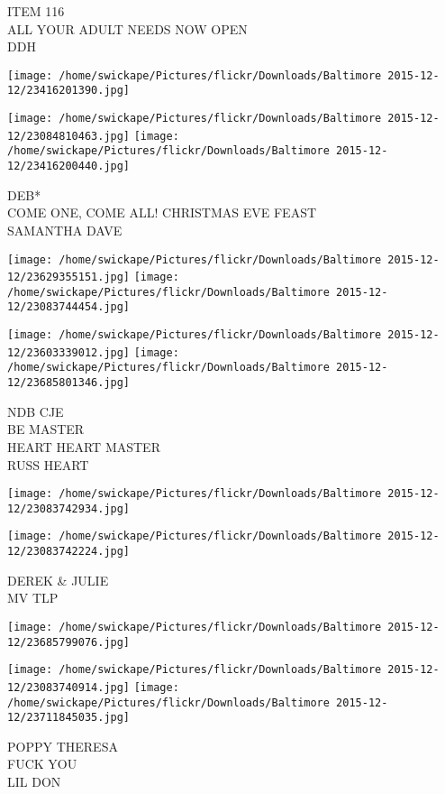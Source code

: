 \documentclass[10pt,letterpaper]{article}
\begin{document}
ITEM 116\\
ALL YOUR ADULT NEEDS NOW OPEN\\
DDH
\pagebreak

\texttt{[image: /home/swickape/Pictures/flickr/Downloads/Baltimore 2015-12-12/23416201390.jpg]}

\vspace{0.25in}
\texttt{[image: /home/swickape/Pictures/flickr/Downloads/Baltimore 2015-12-12/23084810463.jpg]}
\texttt{[image: /home/swickape/Pictures/flickr/Downloads/Baltimore 2015-12-12/23416200440.jpg]}

DEB*\\
COME ONE, COME ALL!  CHRISTMAS EVE FEAST\\
SAMANTHA DAVE
\pagebreak

\texttt{[image: /home/swickape/Pictures/flickr/Downloads/Baltimore 2015-12-12/23629355151.jpg]}
\texttt{[image: /home/swickape/Pictures/flickr/Downloads/Baltimore 2015-12-12/23083744454.jpg]}

\texttt{[image: /home/swickape/Pictures/flickr/Downloads/Baltimore 2015-12-12/23603339012.jpg]}
\texttt{[image: /home/swickape/Pictures/flickr/Downloads/Baltimore 2015-12-12/23685801346.jpg]}

NDB CJE\\
BE MASTER\\
HEART HEART MASTER\\
RUSS HEART
\pagebreak

\texttt{[image: /home/swickape/Pictures/flickr/Downloads/Baltimore 2015-12-12/23083742934.jpg]}

\vspace{0.25in}
\texttt{[image: /home/swickape/Pictures/flickr/Downloads/Baltimore 2015-12-12/23083742224.jpg]}

DEREK \& JULIE\\
MV TLP
\pagebreak

\texttt{[image: /home/swickape/Pictures/flickr/Downloads/Baltimore 2015-12-12/23685799076.jpg]}

\vspace{0.25in}
\texttt{[image: /home/swickape/Pictures/flickr/Downloads/Baltimore 2015-12-12/23083740914.jpg]}
\texttt{[image: /home/swickape/Pictures/flickr/Downloads/Baltimore 2015-12-12/23711845035.jpg]}

POPPY THERESA\\
FUCK YOU\\
LIL DON
\pagebreak
\end{document}

